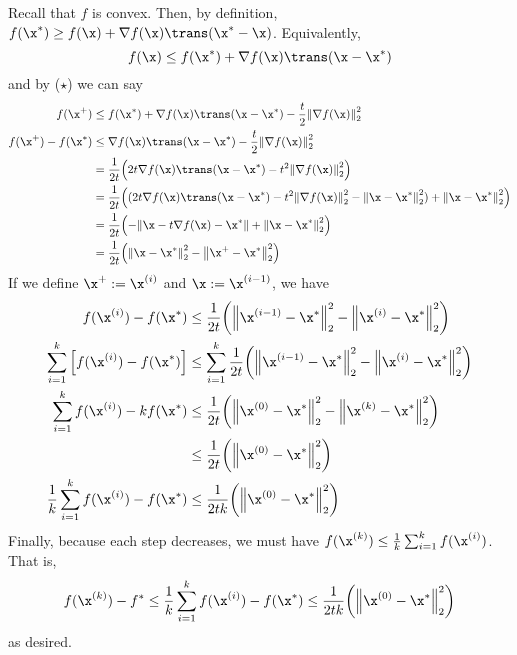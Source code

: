\documentclass[class=cs480,notes,tikz]{agony}
\begin{document}
\begin{prf}
  Recall that $f$ is convex.
  Then, by definition, $f(\x^*) \geq f(\x) + \nabla f(\x)\trans(\x^* - \x)$.
  Equivalently,
  \[ f(\x) \leq f(\x^*) + \nabla f(\x)\trans(\x-\x^*) \]
  and by ($\star$) we can say
  \begin{align*}
    f(\x^+)           & \leq f(\x^*) + \nabla f(\x)\trans(\x-\x^*) - \frac{t}{2}\norm{\nabla f(\x)}_2^2                                          \\
    f(\x^+) - f(\x^*) & \leq \nabla f(\x)\trans(\x-\x^*) - \frac{t}{2}\norm{\nabla f(\x)}_2^2                                                    \\
                      & = \frac1{2t}\qty(2t\nabla f(\x)\trans(\x-\x^*) - t^2\norm{\nabla f(\x)}_2^2)                                             \\
                      & = \frac1{2t}\qty((2t\nabla f(\x)\trans(\x-\x^*) - t^2\norm{\nabla f(\x)}_2^2 - \norm{\x-\x^*}_2^2) + \norm{\x-\x^*}_2^2) \\
                      & = \frac1{2t}\qty(-\norm{\x-t\nabla f(\x)-\x^*} + \norm{\x-\x^*}_2^2)                                                     \\
                      & = \frac1{2t}\qty(\norm{\x-\x^*}_2^2 - \norm{\x^+ - \x^*}_2^2)
  \end{align*}
  If we define $\x^+ := \x^{(i)}$ and $\x := \x^{(i-1)}$, we have
  \begin{align*}
    f(\x^{(i)}) - f(\x^*)
     & \leq \frac{1}{2t}\qty(\norm{\x^{(i-1)}-\x^*}_2^2 - \norm{\x^{(i)} - \x^*}_2^2)              \\
    \sum_{i=1}^k \qty[f(\x^{(i)}) - f(\x^*)]
     & \leq \sum_{i=1}^k \frac{1}{2t}\qty(\norm{\x^{(i-1)}-\x^*}_2^2 - \norm{\x^{(i)} - \x^*}_2^2) \\
    \sum_{i=1}^k f(\x^{(i)}) - k f(\x^*)
     & \leq \frac{1}{2t}\qty(\norm{\x^{(0)}-\x^*}_2^2 - \norm{\x^{(k)} - \x^*}_2^2)                \\
     & \leq \frac{1}{2t}\qty(\norm{\x^{(0)}-\x^*}_2^2)                                             \\
    \frac1k\sum_{i=1}^k f(\x^{(i)}) - f(\x^*)
     & \leq \frac{1}{2tk}\qty(\norm{\x^{(0)}-\x^*}_2^2)
  \end{align*}
  Finally, because each step decreases, we must have $f(\x^{(k)}) \leq \frac1k\sum_{i=1}^k f(\x^{(i)})$.
  That is,
  \begin{align*}
    f(\x^{(k)}) - f^* \leq \frac1k\sum_{i=1}^k f(\x^{(i)}) - f(\x^*) \leq \frac{1}{2tk}\qty(\norm{\x^{(0)}-\x^*}_2^2)
  \end{align*}
  as desired.
\end{prf}
\end{document}
